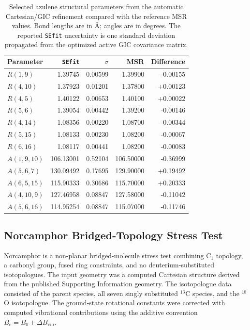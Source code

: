 \documentclass[journal=jctcce,manuscript=article,maxauthors=999]{achemso}
\begin{document}
\begin{table}
\caption{Selected azulene structural parameters from the automatic Cartesian/GIC refinement compared with the reference MSR values. Bond lengths are in \AA; angles are in degrees. The reported \texttt{SEfit} uncertainty is one standard deviation propagated from the optimized active GIC covariance matrix.}
\label{tab:azulene-msr}
\small
\begin{tabular}{lrrrr}
\toprule
Parameter & \texttt{SEfit} & $\sigma$ & MSR & Difference \\
\midrule
$R(1,9)$ & 1.39745 & 0.00599 & 1.39900 & -0.00155 \\
$R(4,10)$ & 1.37923 & 0.01201 & 1.37800 & +0.00123 \\
$R(4,5)$ & 1.40122 & 0.00653 & 1.40100 & +0.00022 \\
$R(5,6)$ & 1.39054 & 0.00442 & 1.39200 & -0.00146 \\
$R(4,14)$ & 1.08356 & 0.00220 & 1.08700 & -0.00344 \\
$R(5,15)$ & 1.08133 & 0.00230 & 1.08200 & -0.00067 \\
$R(6,16)$ & 1.08117 & 0.00441 & 1.08200 & -0.00083 \\
$A(1,9,10)$ & 106.13001 & 0.52104 & 106.50000 & -0.36999 \\
$A(5,6,7)$ & 130.09492 & 0.17695 & 129.90000 & +0.19492 \\
$A(6,5,15)$ & 115.90333 & 0.30686 & 115.70000 & +0.20333 \\
$A(4,10,9)$ & 127.46958 & 0.08847 & 127.58000 & -0.11042 \\
$A(5,6,16)$ & 114.95254 & 0.08847 & 115.07000 & -0.11746 \\
\bottomrule
\end{tabular}
\end{table}


\subsection{Norcamphor Bridged-Topology Stress Test}

Norcamphor is a non-planar bridged-molecule stress test combining C$_1$
topology, a carbonyl group, fused ring constraints, and no
deuterium-substituted isotopologues. The input geometry was a computed
Cartesian structure derived from the published Supporting Information
geometry. The isotopologue data consisted of the parent species, all seven
singly substituted $^{13}$C species, and the $^{18}$O isotopologue. The
ground-state rotational constants were corrected with computed vibrational
contributions using the additive convention $B_e = B_0 + \Delta B_\mathrm{vib}$.
\end{document}
